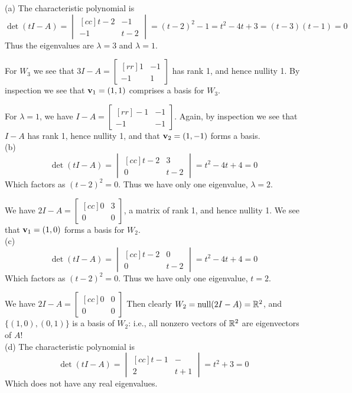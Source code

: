 \begin{solution}
\noindent (a) 
The characteristic polynomial is
$$
\det(t I - A) =
\begin{vmatrix}[cc]
t - 2&-1\\
-1&t-2
\end{vmatrix}
= (t - 2)^2 - 1 = t^2 -4t +3 = (t - 3)(t - 1) =0
$$
Thus the eigenvalues are $\lambda = 3$ and $\lambda = 1$. 

For $W_3$ we see that $3I-A=
\begin{bmatrix}[rr]
1&-1\\
-1&1
\end{bmatrix}
$
has rank 1, and hence nullity 1. By inspection we see that ${\mathbf v}_1=(1,1)$ comprises a basis for $W_3$. 

For $\lambda = 1$, we have $I-A=
\begin{bmatrix}[rr]
-1&-1\\
-1&-1
\end{bmatrix}
$. Again, by inspection we see that $I-A$ has rank 1, hence nullity 1, and that ${\mathbf v}_2=(1,-1)$ forms a basis. 
\\
(b) 
$$
\det(t I- A) =
\begin{vmatrix}[cc]
t - 2& 3\\
0&t - 2
\end{vmatrix} =
t^2 - 4t + 4 = 0
$$
Which factors as $(t -2)^2 = 0$. Thus we have only one eigenvalue, $\lambda = 2$.

We have $2I-A=\begin{bmatrix}[cc]
0&3\\
0&0
\end{bmatrix}
$, a matrix of rank 1, and hence nullity 1. We see that ${\mathbf v}_1=(1,0)$ forms a basis for $W_2$. 
\\
(c) 
$$
\det(t I- A) =
\begin{vmatrix}[cc]
t - 2& 0\\
0&t - 2
\end{vmatrix} =
t^2 - 4t + 4 = 0
$$
Which factors as $(t -2)^2 = 0$. Thus we have only one eigenvalue, $t = 2$. 

We have $2I-A=\begin{bmatrix}[cc]
0&0\\
0&0
\end{bmatrix}
$
Then clearly $W_2=\operatorname{null}(2I-A)={\mathbb R}^2$, and $\{(1,0), (0,1)\}$ is a basis of $W_2$: i.e., all nonzero vectors of ${\mathbb R}^2$ are eigenvectors of $A$! 
 \\
(d) The characteristic polynomial is
$$
\det(t I- A) =
\begin{vmatrix}[cc]
t - 1& -\\
2&t + 1
\end{vmatrix} =
t^2 + 3 = 0
$$
Which does not have any real eigenvalues.
\end{solution}
